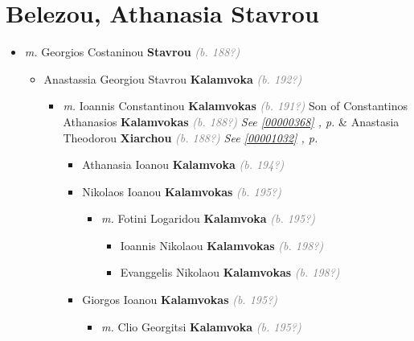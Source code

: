 \documentclass[10pt, openany]{book}
\begin{document}
\chapter{Belezou, Athanasia Stavrou}
\label{00000122}
\textcolor{slmaroon}{\textit{}}
\begin{itemize}
\item{\textit{m.} Georgios Costaninou \textbf{Stavrou} \textcolor{gray}{\textit{(b. 188?)}}   \label{couple:00000122:00000843} \begin{itemize}
\item{Anastassia Georgiou Stavrou \textbf{Kalamvoka} \textcolor{gray}{\textit{(b. 192?)}}
\begin{itemize}
\item{\textit{m.} Ioannis Constantinou \textbf{Kalamvokas} \textcolor{gray}{\textit{(b. 191?)}} Son of  Constantinos Athanasios \textbf{Kalamvokas} \textcolor{gray}{\textit{(b. 188?)}} \textcolor{slteal}{\textit{See  \autoref{00000368} \textit{, p. \pageref{00000368} }}}  \&  Anastasia Theodorou \textbf{Xiarchou} \textcolor{gray}{\textit{(b. 188?)}} \textcolor{slteal}{\textit{See  \autoref{00001032} \textit{, p. \pageref{00001032} }}}   \label{couple:00000363:00000371} \begin{itemize}
\item{Athanasia Ioanou \textbf{Kalamvoka} \textcolor{gray}{\textit{(b. 194?)}}
  }
\item{Nikolaos Ioanou \textbf{Kalamvokas} \textcolor{gray}{\textit{(b. 195?)}}
\begin{itemize}
\item{\textit{m.} Fotini Logaridou \textbf{Kalamvoka} \textcolor{gray}{\textit{(b. 195?)}}   \label{couple:00000366:00000374} \begin{itemize}
\item{Ioannis Nikolaou \textbf{Kalamvokas} \textcolor{gray}{\textit{(b. 198?)}}
  }
\item{Evanggelis Nikolaou \textbf{Kalamvokas} \textcolor{gray}{\textit{(b. 198?)}}
  }
\end{itemize}}
\end{itemize}
  }
\item{Giorgos Ioanou \textbf{Kalamvokas} \textcolor{gray}{\textit{(b. 195?)}}
\begin{itemize}
\item{\textit{m.} Clio Georgitsi \textbf{Kalamvoka} \textcolor{gray}{\textit{(b. 195?)}}   \label{couple:00000365:00000370} \begin{itemize}

\end{itemize}}
\end{itemize}}
\end{itemize}}
\end{itemize}}
\end{itemize}}
\end{itemize}
\end{document}
